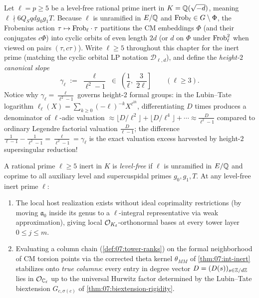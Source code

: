 Let $\ell = p \ge 5$ be a level-free rational prime inert in $K = \mathbb{Q}(\sqrt{-d})$, meaning $\ell \nmid 6 Q_S q d g_0 g_1 T$. Because $\ell$ is unramified in $E/\mathbb{Q}$ and $\mathrm{Frob}_\ell \in G \setminus \Phi$, the Frobenius action $\tau \mapsto \mathrm{Frob}_\ell \cdot \tau$ partitions the CM embeddings $\Phi$ (and their conjugates $c\Phi$) into cyclic orbits of even length $2d$ (or $d$ on $\Phi$ under $\mathrm{Frob}_\ell^2$ when viewed on pairs $(\tau, c\tau)$). Write $\ell \ge 5$ throughout this chapter for the inert prime (matching the cyclic orbital LP notation $\mathcal{D}_{\ell, d}$), and define the \emph{height-$2$ canonical slope}
\begin{equation}
\label{eq:08:gamma-p}
  \gamma_\ell \;:=\; \frac{\ell}{\ell^2 - 1} \;\in\; \left(\frac{1}{\ell},\; \frac{3}{2\ell}\right] \qquad (\ell \ge 3).
\end{equation}
Notice why $\gamma_\ell = \frac{\ell}{\ell^2 - 1}$ governs height-$2$ formal groups: in the Lubin--Tate logarithm $\ell_\ell(X) = \sum_{k \ge 0} (-\ell)^{-k} X^{\ell^{2k}}$, differentiating $D$ times produces a denominator of $\ell$-adic valuation $\approx \lfloor D / \ell^2 \rfloor + \lfloor D / \ell^4 \rfloor + \cdots \approx \frac{D}{\ell^2 - 1}$ compared to ordinary Legendre factorial valuation $\frac{D}{\ell - 1}$; the difference $\frac{1}{\ell - 1} - \frac{1}{\ell^2 - 1} = \frac{\ell}{\ell^2 - 1} = \gamma_\ell$ is the exact valuation excess harvested by height-$2$ supersingular reduction!

\begin{definition}
\label{def:08:level-free}
A rational prime $\ell \ge 5$ inert in $K$ is \emph{level-free} if $\ell$ is unramified in $E/\mathbb{Q}$ and coprime to all auxiliary level and supercuspidal primes $g_0, g_1, T$. At any level-free inert prime $\ell$:
\begin{enumerate}[label=\textup{(\roman*)}]
\item The local host realization exists without ideal coprimality restrictions (by moving $\mathfrak{a}_0$ inside its genus to a $\ell$-integral representative via weak approximation), giving local $\mathcal{O}_{K_\ell}$-orthonormal bases at every tower layer $0 \le j \le m$.
\item Evaluating a column chain (\cref{def:07:tower-ranks}) on the formal neighborhood of CM torsion points via the corrected theta kernel $\theta_{MM}$ of \cref{thm:07:int-inert} stabilizes onto \emph{true columns}: every entry in degree vector $D = (D(s))_{s \in \mathbb{Z}/d\mathbb{Z}}$ lies in $\mathcal{O}_{\mathbb{C}_\ell}$ up to the universal Hurwitz factor determined by the Lubin--Tate biextension $G_{c,\sigma(c)}$ of \cref{thm:07:biextension-rigidity}.
\end{enumerate}
\end{definition}

